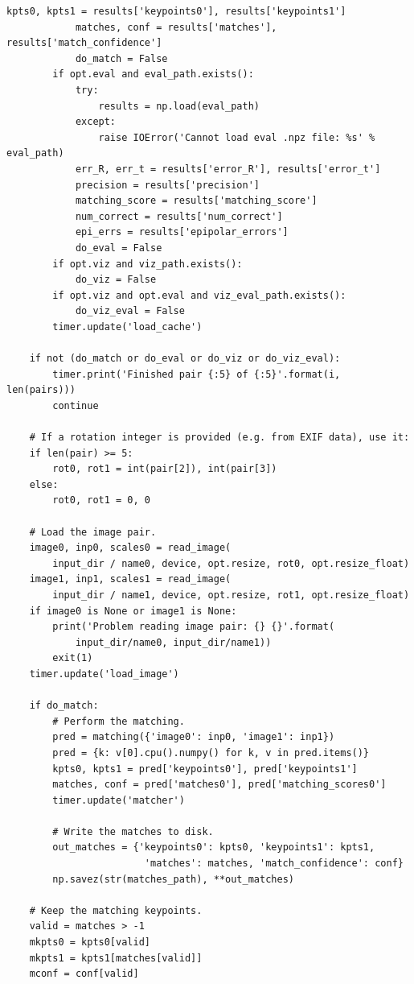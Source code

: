 \documentclass[letterpaper,12pt]{article}
\begin{document}
\begin{lstlisting}[caption={Sample Code Snippet for Evaluation},captionpos=b]
            kpts0, kpts1 = results['keypoints0'], results['keypoints1']
            matches, conf = results['matches'], results['match_confidence']
            do_match = False
        if opt.eval and eval_path.exists():
            try:
                results = np.load(eval_path)
            except:
                raise IOError('Cannot load eval .npz file: %s' % eval_path)
            err_R, err_t = results['error_R'], results['error_t']
            precision = results['precision']
            matching_score = results['matching_score']
            num_correct = results['num_correct']
            epi_errs = results['epipolar_errors']
            do_eval = False
        if opt.viz and viz_path.exists():
            do_viz = False
        if opt.viz and opt.eval and viz_eval_path.exists():
            do_viz_eval = False
        timer.update('load_cache')

    if not (do_match or do_eval or do_viz or do_viz_eval):
        timer.print('Finished pair {:5} of {:5}'.format(i, len(pairs)))
        continue

    # If a rotation integer is provided (e.g. from EXIF data), use it:
    if len(pair) >= 5:
        rot0, rot1 = int(pair[2]), int(pair[3])
    else:
        rot0, rot1 = 0, 0

    # Load the image pair.
    image0, inp0, scales0 = read_image(
        input_dir / name0, device, opt.resize, rot0, opt.resize_float)
    image1, inp1, scales1 = read_image(
        input_dir / name1, device, opt.resize, rot1, opt.resize_float)
    if image0 is None or image1 is None:
        print('Problem reading image pair: {} {}'.format(
            input_dir/name0, input_dir/name1))
        exit(1)
    timer.update('load_image')

    if do_match:
        # Perform the matching.
        pred = matching({'image0': inp0, 'image1': inp1})
        pred = {k: v[0].cpu().numpy() for k, v in pred.items()}
        kpts0, kpts1 = pred['keypoints0'], pred['keypoints1']
        matches, conf = pred['matches0'], pred['matching_scores0']
        timer.update('matcher')

        # Write the matches to disk.
        out_matches = {'keypoints0': kpts0, 'keypoints1': kpts1,
                        'matches': matches, 'match_confidence': conf}
        np.savez(str(matches_path), **out_matches)

    # Keep the matching keypoints.
    valid = matches > -1
    mkpts0 = kpts0[valid]
    mkpts1 = kpts1[matches[valid]]
    mconf = conf[valid]


\end{lstlisting}
\end{document}

